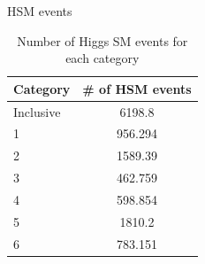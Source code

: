 \documentclass[10pt,UKenglish, leqno, xcolor = dvipsnames]{beamer}
\begin{document}
		\begin{frame}{HSM events}
			\vfill
			\centering
			\begin{table}[tbp]
				\centering
				\begin{tabular}{lc}
					\toprule[1.5pt]
					Category	& \# of HSM events	\\
					\midrule
					Inclusive	& 6198.8			\\
					1 			& 956.294 			\\
					2 			& 1589.39 			\\
					3 			& 462.759			\\
					4		 	& 598.854			\\
					5 			& 1810.2			\\
					6 			& 783.151			\\
					\bottomrule[1.5pt]
				\end{tabular}
				\caption{Number of Higgs SM events for each category}
			\end{table}
			\vfill
		\end{frame}	
	
\end{document}
